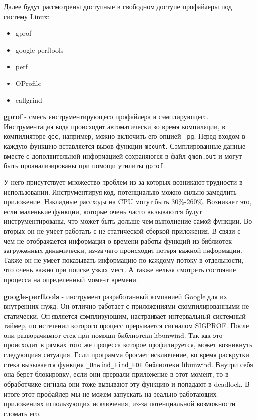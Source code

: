     Далее будут рассмотрены доступные в свободном доступе профайлеры под систему Linux:
    \begin{itemize}
    	\item gprof \cite{gprof}
        \item google-perftools  \cite{gperf}
        \item perf \cite{perf}
        \item OProfile \cite{oprofile}
        \item callgrind \cite{valgrind}
    \end{itemize}
    
    \textbf{gprof} - смесь инструментирующего профайлера и сэмплирующего. Инструментация кода происходит автоматически во время компиляции, в компилияторе \verb|gcc|, например, можно включить его опцией \verb|-pg|. Перед входом в каждую функцию вставляется вызов функции \verb|mcount|. Сэмплированные данные вместе с дополнительной информацией сохраняются в файл \verb|gmon.out| и могут быть проанализированы при помощи утилиты \verb|gprof|.
    
    У него присутствует множество проблем из-за которых возникают трудности в использовании. Инструментируя код, потенциально можно сильно замедлить приложение. Накладные рассходы на CPU могут быть 30\%-260\%. Возникает это, если маленькие функции, которые очень часто вызываются будут инструментированы, что может быть дольше чем выполнение самой функции. Во вторых он не умеет работать с не статической сборкой приложения. В связи с чем не отображается информация о времени работы функций из библиотек загруженных динамически, из-за чего происходит потеря важной информации. Также он не умеет показывать информацию по каждому потоку в отдельности, что очень важно при поиске узких мест.  А также нельзя смотреть состояние процесса на определенный момент времени.
    
    \textbf{google-perftools} - инструмент разработанный компанией Google для их внутренних нужд. Он отлично работает с приложениями скомпилированными не статически. Он является сэмплирующим, настраивает интервальный  системный таймер, по истечении которого процесс прерывается сигналом SIGPROF. После они разворачивают стек при помощи библиотеки libunwind. Так как это происходит в рамках того же процесса которое профилируется, может возникнуть следующиая ситуация. Если программа бросает исключение, во время раскрутки стека вызывается функция \verb|_Unwind_Find_FDE| библиотеки libunwind. Внутри себя она берет блокировку, если они прервали приложение в этот момент, то в обработчике сигнала они тоже вызывают эту функцию и попадают в deadlock. В итоге этот профайлер мы не можем запускать на реально работающих приложениях использующих исключения, из-за потенциальной возможности сломать его.
    
